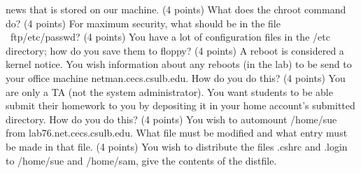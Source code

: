 news that is stored on our machine.
\vskip 1.0in
\ques
(4 points)
What does the {\ltt{}chroot} command do?
\vskip 0.7in
\ques
(4 points)
For maximum security, 
what should be in the file {\ltt{}~ftp/etc/passwd}?
\vskip 0.9in
\ques
(4 points)
You have a lot of configuration files in the {\ltt{}/etc} directory;
how do you save them to floppy?
\vskip 0.7in
\ques
(4 points)
A reboot is considered a kernel notice. You wish information about
any reboots (in the lab) to be send to your office machine 
{\ltt{}netman.cecs.csulb.edu}. How do you do this?
\vfill\eject
\ques
(4 points)
You are only a TA (not the system administrator).
You want students to be able submit their homework to you by
depositing it in your home account's {\ltt{}submitted} directory.
How do you do this?
\vskip 2.5in
\ques
(4 points)
You wish to automount {\ltt{}/home/sue} from {\ltt{}lab76.net.cecs.csulb.edu}.
What file must be modified and what entry must be made in that file.
\vskip 1.5in
\ques
(4 points)
You wish to distribute the files {\ltt{}.cshrc} and {\ltt{}.login}
to {\ltt{}/home/sue} and {\ltt{}/home/sam}, give the contents
of the distfile.
\vskip 1.5in
\bye
